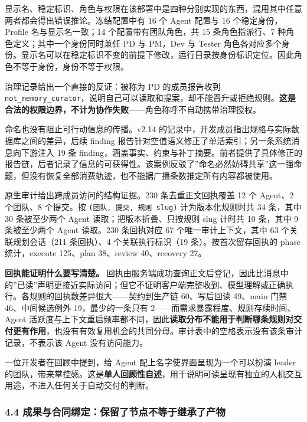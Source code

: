 \documentclass[
]{article}
\begin{document}
显示名、稳定标识、角色与权限在该部署中是四种分别实现的东西，混用其中任意两者都会得出错误推论。冻结配置中有
16 个 Agent 配置与 16 个稳定身份，Profile 名与显示名一致；14
个配置带有团队角色，共 15 条角色指派行、7
种角色定义；其中一个身份同时兼任 PD 与 PM，Dev 与 Tester
角色各对应多个身份。显示名可以在稳定标识不变的前提下修改，运行目录按身份标识定位。因此角色不等于身份，身份不等于权限。

治理记录给出一个直接的反证：被称为 PD 的成员报告收到
\texttt{not\_memory\_curator}，说明自己可以读取和提案，却不能晋升或拒绝规则。\textbf{这是合法的权限边界，不计为协作失败}------角色称呼不自动携带治理授权。

命名也没有阻止可行动信息的传播。v2.14
的记录中，开发成员指出规格与实际数据库之间的差异，后续 finding
报告针对空值语义修正了单活索引；另一条系统消息向下游注入 19 条
finding，涵盖事实、约束与补丁摘要。前者提供了具体修正的报告链，后者记录了信息的可获得性。该案例反驳了''命名必然妨碍共享''这一强命题，但没有恢复全部消费轨迹，也不能据广播条数推定所有内容都被使用。

原生审计给出跨成员访问的结构证据。230 条去重正文回执覆盖 12 个 Agent、2
个团队、8 个提交。按 \texttt{(团队,\ 提交,\ 规则\ slug)}
计为版本化规则时共 34 条，其中 30 条被至少两个 Agent
读取；把版本折叠、只按规则 slug 计时共 10 条，其中 9 条被至少两个 Agent
读取。230 条回执对应 67 个唯一审计上下文，其中 63 个关联规划会话（211
条回执）、4 个关联执行标识（19 条）。按首次留存回执的 phase
统计，execute 125、plan 38、review 40、recovery 27。

\textbf{回执能证明什么要写清楚。}
回执由服务端成功查询正文后登记，因此比消息中的''已读''声明更接近实际访问；但它不证明客户端完整收到、模型理解或正确执行。各规则的回执数差异很大------契约到生产链
60、写后回读 49、main 门禁 46、中间候选例外 19，最少的一条只有
2------而需求暴露程度、规则存续时间、Agent
活跃度与上下文重启频率都不同，因此\textbf{读取分布不能用于判断哪条规则对交付更有作用}，也没有有效复用机会的共同分母。审计表中的空格表示没有该条审计记录，不表示该
Agent 没有访问能力。

一位开发者在回顾中提到，给 Agent 配上名字使界面呈现为一个可以扮演 leader
的团队，带来掌控感。这是\textbf{单人回顾性自述}，用于说明可读呈现有独立的人机交互用途，不进入任何关于自动交付的判断。

\subsubsection{4.4
成果与合同绑定：保留了节点不等于继承了产物}\label{ux6210ux679cux4e0eux5408ux540cux7ed1ux5b9aux4fddux7559ux4e86ux8282ux70b9ux4e0dux7b49ux4e8eux7ee7ux627fux4e86ux4ea7ux7269}
\end{document}
